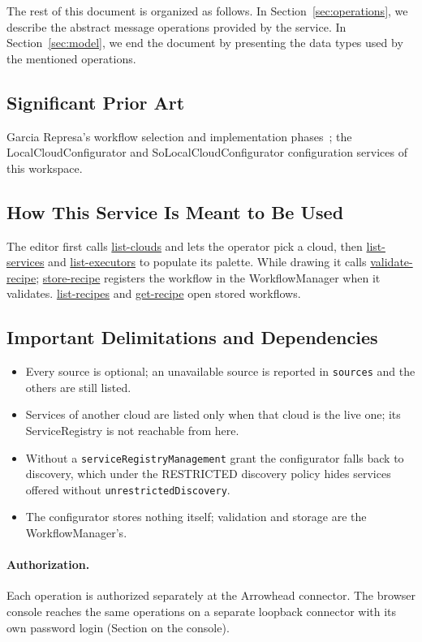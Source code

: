 \documentclass[a4paper]{arrowhead}
\newcommand{\oref}[1]{{\textcolor{ArrowheadBlue}{\hyperref[sec:operations:#1]{#1}}}}
\begin{document}
The rest of this document is organized as follows.
In Section~\ref{sec:operations}, we describe the abstract message operations provided by the service.
In Section~\ref{sec:model}, we end the document by presenting the data types used by the mentioned operations.

\subsection{Significant Prior Art}
Garcia Represa's workflow selection and implementation phases~\cite{represa2022}; the
LocalCloudConfigurator and SoLocalCloudConfigurator configuration services of this workspace.

\subsection{How This Service Is Meant to Be Used}
The editor first calls \oref{list-clouds} and lets the operator pick a cloud, then \oref{list-services} and
\oref{list-executors} to populate its palette. While drawing it calls \oref{validate-recipe}; \oref{store-recipe}
registers the workflow in the WorkflowManager when it validates. \oref{list-recipes} and \oref{get-recipe} open stored
workflows.

\subsection{Important Delimitations and Dependencies}
\label{sec:delimitations}
\begin{itemize}
\item Every source is optional; an unavailable source is reported in \texttt{sources} and the others are still listed.
\item Services of another cloud are listed only when that cloud is the live one; its ServiceRegistry is not reachable from here.
\item Without a \texttt{serviceRegistryManagement} grant the configurator falls back to discovery, which under the RESTRICTED discovery policy hides services offered without \texttt{unrestrictedDiscovery}.
\item The configurator stores nothing itself; validation and storage are the WorkflowManager's.
\end{itemize}

\paragraph{Authorization.} Each operation is authorized separately at the Arrowhead connector. The browser console reaches the same operations on a separate loopback connector with its own password login (Section on the console).
\end{document}
